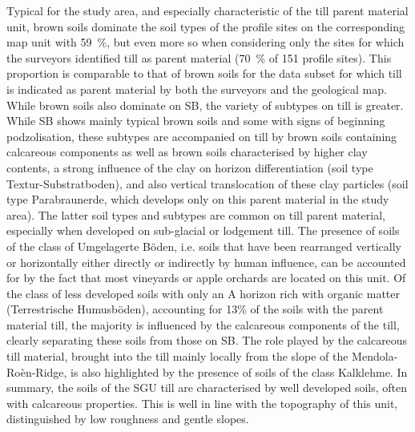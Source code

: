 \documentclass[preprint,12pt,authoryear]{elsarticle}
\begin{document}
 Typical for the study area, and especially characteristic of the till parent material unit, brown soils dominate the soil types of the profile sites on the corresponding  map unit with 59~\%, but even more so when considering only the sites for which the surveyors identified till as parent material (70~\% of 151 profile sites). This proportion is comparable to that of brown soils for the data subset for which till is indicated as parent material by both the surveyors and the geological map. While brown soils also dominate on SB, the variety of subtypes on till is greater. While SB shows mainly typical brown soils and some with signs of beginning podzolisation, these subtypes are accompanied on till by brown soils containing calcareous components as well as brown soils characterised by higher clay contents, a strong influence of the clay on horizon differentiation (soil type Textur-Substratboden), and also vertical translocation of these clay particles (soil type Parabraunerde, which develops only on this parent material in the study area). The latter soil types and subtypes are common on till parent material, especially when developed on sub-glacial or lodgement till.  The presence of soils of the class of Umgelagerte B\"oden, i.e. soils that have been rearranged vertically or horizontally either directly or indirectly by human influence, can be accounted for by the fact that most vineyards or apple orchards are located on this unit. Of the class of less developed soils with only an A horizon rich with organic matter (Terrestrische Humusb\"oden), accounting for 13\% of the soils with the parent material till, the majority is influenced by the calcareous components of the till, clearly separating these soils from those on SB. The role played by the calcareous till material, brought into the till mainly locally from the slope of the Mendola-Ro\`en-Ridge, is also highlighted by the presence of soils of the class Kalklehme. In summary, the soils of the SGU till are characterised by well developed soils, often with calcareous properties. This is well in line with the topography of this unit, distinguished by low roughness and gentle slopes.
\end{document}
